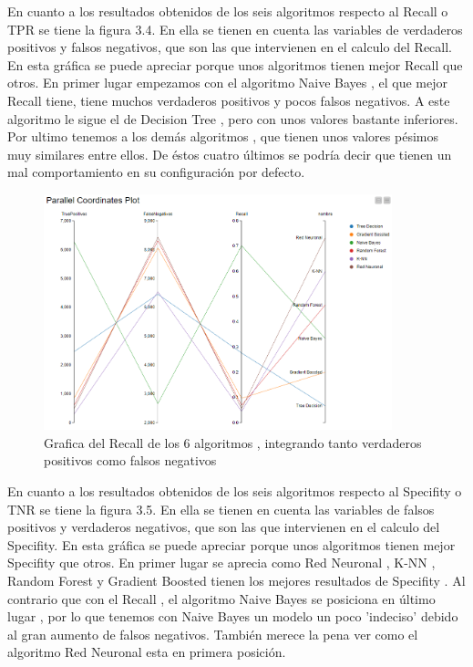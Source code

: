 	En cuanto a los resultados obtenidos de los seis algoritmos respecto al Recall o TPR se tiene la figura 3.4. En ella se tienen en cuenta las variables
	de verdaderos positivos y falsos negativos, que son las que intervienen en el calculo del Recall. En esta gráfica se puede apreciar porque unos algoritmos tienen 
	mejor Recall que otros. En primer lugar empezamos con el algoritmo Naive Bayes , el que mejor Recall tiene, tiene muchos verdaderos positivos y pocos falsos negativos. 
	A este algoritmo le sigue el de Decision Tree , pero con unos valores bastante inferiores. Por ultimo tenemos a los demás algoritmos , que tienen unos valores pésimos muy similares entre ellos. 
	De éstos cuatro últimos se podría decir que tienen un mal comportamiento en su configuración por defecto.  \\

	\begin{figure}[htb]
		\centering
		\includegraphics[width=0.9\textwidth]{./imagenes/37}
		\caption{Grafica del Recall de los 6 algoritmos , integrando tanto verdaderos positivos como falsos negativos} \label{fig:1}
	\end{figure}

	En cuanto a los resultados obtenidos de los seis algoritmos respecto al Specifity o TNR se tiene la figura 3.5. En ella se tienen en cuenta las variables
	de falsos positivos y verdaderos negativos, que son las que intervienen en el calculo del Specifity. En esta gráfica se puede apreciar porque unos algoritmos tienen 
	mejor Specifity que otros. En primer lugar se aprecia como Red Neuronal , K-NN  , Random Forest y Gradient Boosted tienen los mejores resultados de Specifity . Al contrario 
	que con el Recall , el algoritmo Naive Bayes se posiciona en último lugar , por lo que tenemos con Naive Bayes un modelo un poco 'indeciso' debido al gran aumento de falsos negativos.
	También merece la pena ver como el algoritmo Red Neuronal esta en primera posición.  \\

